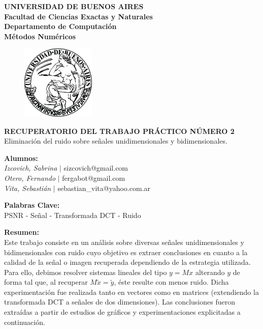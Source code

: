 \documentclass[10pt, a4paper]{article}
\begin{document}
\thispagestyle{empty}
\begin{center}

\Huge{ \bf{UNIVERSIDAD DE BUENOS AIRES}}
\\
\LARGE{\bf{Facultad de Ciencias Exactas y Naturales}}
\\
\textbf{Departamento de Computaci\'on}
\\
\textbf{M\'etodos Num\'ericos}
\vspace{2.0\baselineskip}
\end{center}


\begin{figure}[h] %
\begin{center}
\includegraphics[width=100pt]{./image.jpeg}
\end{center}
\end{figure}
\begin{center}
\vspace*{0.5cm}

\huge{\bf RECUPERATORIO DEL TRABAJO PR\'ACTICO N\'UMERO 2}\\
\huge{Eliminaci\'on del ruido sobre se\~nales unidimensionales y bidimensionales.}
\vspace*{1.6cm}

\end{center}

\LARGE {\textbf{Alumnos:}}\\
\Large{\textsl{Izcovich, Sabrina} $|$ sizcovich@gmail.com}\\
\Large{\textsl{Otero, Fernando} \hspace{0.1cm}$|$ fergabot@gmail.com}\\
\Large{\textsl{Vita, Sebasti\'an} \hspace{0.37cm}$|$ sebastian\_vita@yahoo.com.ar}
\vspace{0.6cm}

\LARGE {\textbf{Palabras Clave:}}\\
\large {PSNR - Señal - Transformada DCT - Ruido}
\vspace*{1cm}

\LARGE{\textbf{Resumen:}}\\
\large {Este trabajo consiste en un an\'alisis sobre diversas señales unidimensionales y bidimensionales con ruido cuyo objetivo es extraer conclusiones en cuanto a la calidad de la señal o imagen recuperada dependiendo de la estrategia utilizada. Para ello, debimos resolver sistemas lineales del tipo $y = Mx$ alterando $y$ de forma tal que, al recuperar $M \tilde{x} = \tilde{y}$, éste resulte con menos ruido. Dicha experimentación fue realizada tanto en vectores como en matrices (extendiendo la transformada DCT a señales de dos dimensiones). Las conclusiones fueron extraídas a partir de estudios de gráficos y experimentaciones explicitadas a continuación.}
\newline
 
\end{document}

